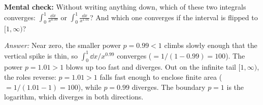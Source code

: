 \begin{recoverybox}
\textbf{Mental check:} Without writing anything down, which of these two integrals converges:
$\displaystyle\int_0^1 \frac{\dd x}{x^{0.99}}$ or $\displaystyle\int_0^1 \frac{\dd x}{x^{1.01}}$?
And which one converges if the interval is flipped to $[1,\infty)$?

\emph{Answer:} Near zero, the smaller power $p = 0.99 < 1$ climbs slowly enough that the vertical spike is thin, so $\int_0^1 \dd x/x^{0.99}$ converges ($= 1/(1-0.99) = 100$). The power $p = 1.01 > 1$ blows up too fast and diverges. Out on the infinite tail $[1,\infty)$, the roles reverse: $p = 1.01 > 1$ falls fast enough to enclose finite area ($= 1/(1.01-1) = 100$), while $p = 0.99$ diverges. The boundary $p = 1$ is the logarithm, which diverges in both directions.
\end{recoverybox}

